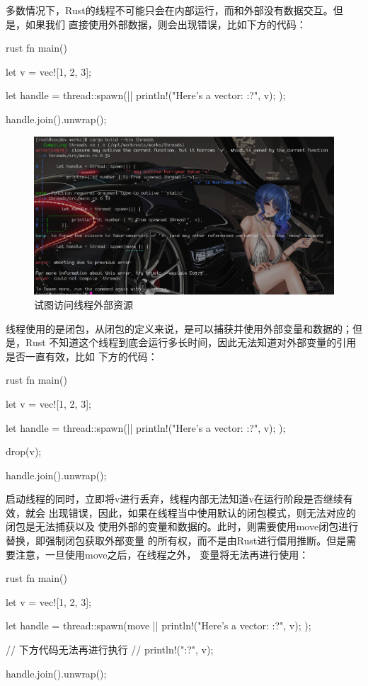 多数情况下，Rust的线程不可能只会在内部运行，而和外部没有数据交互。但是，如果我们
直接使用外部数据，则会出现错误，比如下方的代码：
\begin{code-block}{rust}
fn main() {
    let v = vec![1, 2, 3];

    let handle = thread::spawn(|| {
        println!("Here's a vector: {:?}", v);
    });

    handle.join().unwrap();
}
\end{code-block}
\begin{figure}[H]
  \centering
  \includegraphics[width=\linewidth]{rust_thread_out_params.png}
  \caption{试图访问线程外部资源}
  \label{fig:rust_thread_out_params}
\end{figure}
线程使用的是闭包，从闭包的定义来说，是可以捕获并使用外部变量和数据的；但是，Rust
不知道这个线程到底会运行多长时间，因此无法知道对外部变量的引用是否一直有效，比如
下方的代码：
\begin{code-block}{rust}
fn main() {

    let v = vec![1, 2, 3];

    let handle = thread::spawn(|| {
        println!("Here's a vector: {:?}", v);
    });

    drop(v);

    handle.join().unwrap();
}
\end{code-block}
启动线程的同时，立即将v进行丢弃，线程内部无法知道v在运行阶段是否继续有效，就会
出现错误，因此，如果在线程当中使用默认的闭包模式，则无法对应的闭包是无法捕获以及
使用外部的变量和数据的。此时，则需要使用move闭包进行替换，即强制闭包获取外部变量
的所有权，而不是由Rust进行借用推断。但是需要注意，一旦使用move之后，在线程之外，
变量将无法再进行使用：
\begin{code-block}{rust}
fn main() {
    let v = vec![1, 2, 3];

    let handle = thread::spawn(move || {
        println!("Here's a vector: {:?}", v);
    });

    // 下方代码无法再进行执行
    // println!("{:?}", v);

    handle.join().unwrap();
}
\end{code-block}

